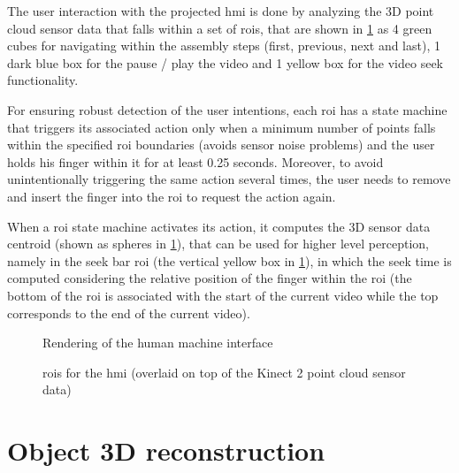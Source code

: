 The user interaction with the projected \gls{hmi} is done by analyzing the 3D point cloud sensor data that falls within a set of \glspl{roi}, that are shown in \cref{fig:interaction-rois} as 4 green cubes for navigating within the assembly steps (first, previous, next and last), 1 dark blue box for the pause / play the video and 1 yellow box for the video seek functionality.

For ensuring robust detection of the user intentions, each \gls{roi} has a state machine that triggers its associated action only when a minimum number of points falls within the specified \gls{roi} boundaries (avoids sensor noise problems) and the user holds his finger within it for at least 0.25 seconds. Moreover, to avoid unintentionally triggering the same action several times, the user needs to remove and insert the finger into the \gls{roi} to request the action again.

When a \gls{roi} state machine activates its action, it computes the 3D sensor data centroid (shown as spheres in \cref{fig:interaction-rois}), that can be used for higher level perception, namely in the seek bar \gls{roi} (the vertical yellow box in \cref{fig:interaction-rois}), in which the seek time is computed considering the relative position of the finger within the \gls{roi} (the bottom of the \gls{roi} is associated with the start of the current video while the top corresponds to the end of the current video).

\begin{figure}[H]
	\begin{floatrow}[2]
		{\caption{Rendering of the human machine interface}\label{fig:human-machine-interface}}
		{\caption{\glspl{roi} for the \gls{hmi} (overlaid on top of the Kinect 2 point cloud sensor data)}\label{fig:interaction-rois}}
	\end{floatrow}
\end{figure}


\section{Object 3D reconstruction}\label{sec:object-reconstruction}

